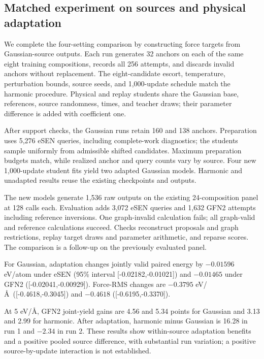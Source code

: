 \subsection{Matched experiment on sources and physical adaptation}\label{sec:factorial-details}
We complete the four-setting comparison by constructing force targets from Gaussian-source outputs. Each run generates 32 anchors on each of the same eight training compositions, records all 256 attempts, and discards invalid anchors without replacement. The eight-candidate escort, temperature, perturbation bounds, source seeds, and 1,000-update schedule match the harmonic procedure. Physical and replay students share the Gaussian base, references, source randomness, times, and teacher draws; their parameter difference is added with coefficient one.

After support checks, the Gaussian runs retain 160 and 138 anchors. Preparation uses 5,276 eSEN queries, including complete-work diagnostics; the students sample uniformly from admissible shifted candidates. Maximum preparation budgets match, while realized anchor and query counts vary by source. Four new 1,000-update student fits yield two adapted Gaussian models. Harmonic and unadapted results reuse the existing checkpoints and outputs.

The new models generate 1,536 raw outputs on the existing 24-composition panel at 128 calls each. Evaluation adds 3,072 eSEN queries and 1,632 GFN2 attempts including reference inversions. One graph-invalid calculation fails; all graph-valid and reference calculations succeed. Checks reconstruct proposals and graph restrictions, replay target draws and parameter arithmetic, and reparse scores. The comparison is a follow-up on the previously evaluated panel.

For Gaussian, adaptation changes jointly valid paired energy by $-0.01596$ eV/atom under eSEN (95\% interval [-0.02182,-0.01021]) and $-0.01465$ under GFN2 ([-0.02041,-0.00929]). Force-RMS changes are $-0.3795$ eV/\AA\ ([-0.4618,-0.3045]) and $-0.4618$ ([-0.6195,-0.3370]).

At 5 eV/\AA, GFN2 joint-yield gains are 4.56 and 5.34 points for Gaussian and 3.13 and 2.99 for harmonic. After adaptation, harmonic minus Gaussian is 16.28 in run 1 and $-2.34$ in run 2. These results show within-source adaptation benefits and a positive pooled source difference, with substantial run variation; a positive source-by-update interaction is not established.
